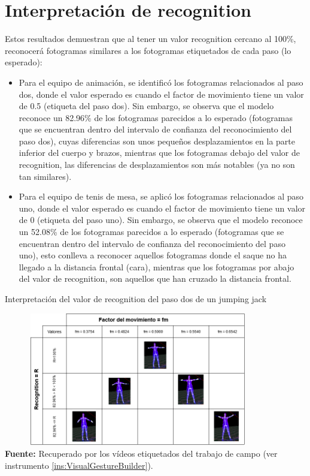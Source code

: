 \section{Interpretaci\'on de recognition} \label{res:recognition}
Estos resultados demuestran que al tener un valor recognition cercano al 100\%, reconocer\'a fotogramas similares a los fotogramas etiquetados de cada paso (lo esperado):
\begin{itemize}
\item  Para el equipo de animaci\'on, se identific\'o los fotogramas relacionados al paso dos, donde el valor esperado es cuando el factor de movimiento tiene un valor de 0.5 (etiqueta del paso dos). Sin embargo, se observa que el modelo reconoce un 82.96\% de los fotogramas parecidos a lo esperado (fotogramas que se encuentran dentro del intervalo de confianza del reconocimiento del paso dos), cuyas diferencias son unos peque\~nos desplazamientos en la parte inferior del cuerpo y brazos, mientras que los fotogramas debajo del valor de recognition, las diferencias de desplazamientos son m\'as notables (ya no son tan similares).
\item  Para el equipo de tenis de mesa, se aplic\'o  los fotogramas relacionados al paso uno, donde el valor esperado es cuando el factor de movimiento tiene un valor de 0 (etiqueta del paso uno). Sin embargo, se observa que el modelo reconoce un 52.08\% de los fotogramas parecidos a lo esperado (fotogramas que se encuentran dentro del intervalo de confianza del reconocimiento del paso uno), esto conlleva a reconocer aquellos fotogramas donde el saque no ha llegado a la distancia frontal (cara), mientras que los fotogramas por abajo del valor de recognition, son aquellos que han cruzado la distancia frontal.
\end{itemize}
\begin{table}[H]
	\caption{Interpretaci\'on del valor de recognition del paso dos de un jumping jack}
	\label{fig:recognitionJumpingJack}
	\centering
	\includegraphics[width=445px,height=220px]{graphics/resultados/recognitionChe.PNG} \\
	\textbf{Fuente:} Recuperado por los v\'ideos etiquetados del trabajo de campo (ver instrumento \ref{ins:VisualGestureBuilder}).
\end{table}
